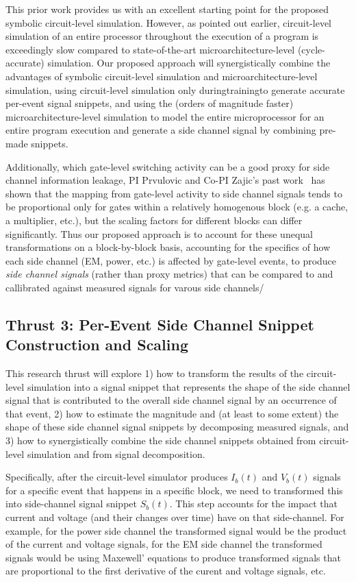 This prior work provides us with an excellent starting point for the proposed symbolic circuit-level simulation. However, as pointed out earlier, circuit-level simulation of an entire processor throughout the execution of a program is exceedingly slow compared to state-of-the-art microarchitecture-level (cycle-accurate) simulation. Our proposed approach will synergistically combine the advantages of symbolic circuit-level simulation and microarchitecture-level simulation, using circuit-level simulation only duringtrainingto generate accurate per-event signal snippets, and using the (orders of magnitude faster) microarchitecture-level simulation to model the entire microprocessor for an entire program execution and generate a side channel signal by combining pre-made snippets.

Additionally, which gate-level switching activity can be a good proxy for side channel information leakage, PI Prvulovic and Co-PI Zajic's past work~\cite{Nader2020} has shown that the mapping from gate-level activity to side channel signals tends to be proportional only for gates within a relatively homogenous block (e.g. a cache, a multiplier, etc.), but the scaling factors for different blocks can differ significantly. Thus our proposed approach is to account for these unequal transformations on a block-by-block basis, accounting for the specifics of how each side channel (EM, power, etc.) is affected by gate-level events, to produce {\em side channel signals} (rather than proxy metrics) that can be compared to and callibrated against measured signals for varous side channels/

\subsection{Thrust 3: Per-Event Side Channel Snippet Construction and Scaling}
\label{sec:proposed-transform}

This research thrust will explore 1) how to transform the results of the circuit-level simulation into a signal snippet that represents the shape of the side channel signal that is contributed to the overall side channel signal by an occurrence of that event, 2) how to estimate the magnitude and (at least to some extent) the shape of these side channel signal snippets by decomposing measured signals, and 3) how to synergistically combine the side channel snippets obtained from circuit-level simulation and from signal decomposition.

Specifically, after the circuit-level simulator produces $I_b(t)$ and $V_b(t)$ signals for a specific event that happens in a specific block, we need to transformed this into side-channel signal snippet $S_b(t)$. This step accounts for the impact that current and voltage (and their changes over time) have on that side-channel. For example, for the power side channel the transformed signal would be the product of the current and voltage signals, for the EM side channel the transformed signals would be using Maxewell' equations to produce transformed signals that are proportional to the first derivative of the curent and voltage signals, etc.

